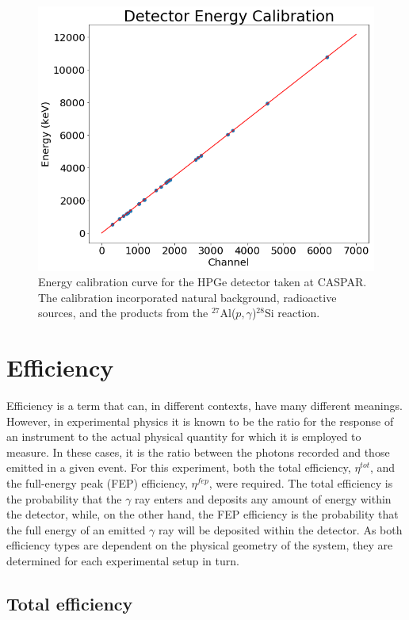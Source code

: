 \begin{figure}
\centering
\includegraphics[width=0.8\linewidth]{figures/detEnergyCalibration.png}
\caption{Energy calibration curve for the HPGe detector taken at CASPAR. The calibration incorporated natural background, radioactive sources, and the products from the $^{27}$Al($p, \gamma$)$^{28}$Si reaction. }
\label{fig: energyCalibration}
\end{figure}





\section{Efficiency}
\label{sec: efficiency}

Efficiency is a term that can, in different contexts, have many different meanings. However, in experimental physics it is known to be the ratio for the response of an instrument to the actual physical quantity for which it is employed to measure. In these cases, it is the ratio between the photons recorded and those emitted in a given event. For this experiment, both the total efficiency, $\eta^{tot}$, and the full-energy peak (FEP) efficiency, $\eta^{fep}$, were required. The total efficiency is the probability that the $\gamma$ ray enters and deposits any amount of energy within the detector, while, on the other hand, the FEP efficiency is the probability that the full energy of an emitted $\gamma$ ray will be deposited within the detector. As both efficiency types are dependent on the physical geometry of the system, they are determined for each experimental setup in turn. 

\subsection{Total efficiency}
\label{subsec: totEff}

